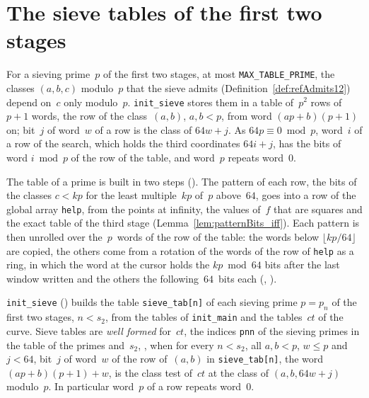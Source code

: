 \section{The sieve tables of the first two stages}\label{sec:sieveTables}

For a sieving prime~$p$ of the first two stages, at most \texttt{MAX\_TABLE\_PRIME}, the classes
$(a, b, c)$ modulo~$p$ that the sieve admits (Definition~\ref{def:refAdmits12}) depend on~$c$ only
modulo~$p$. \texttt{init\_sieve} stores them in a table of~$p^2$ rows of~$p + 1$ words, the row of
the class~$(a, b)$, $a, b < p$, from word $(a p + b)(p + 1)$ on; bit~$j$ of word~$w$ of a row is
the class of $64 w + j$. As $64 p \equiv 0 \bmod p$, word~$i$ of a row of the search, which holds
the third coordinates $64 i + j$, has the bits of word $i \bmod p$ of the row of the table, and
word~$p$ repeats word~$0$.

The table of a prime is built in two steps (). The pattern of each
row, the bits of the classes $c < k p$ for the least multiple~$k p$ of~$p$ above~$64$, goes into a
row of the global array \texttt{help}, from the points at infinity, the values of~$f$ that are
squares and the exact table of the third stage (Lemma~\ref{lem:patternBits_iff}). Each pattern is
then unrolled over the~$p$~words of the row of the table: the words below $\lfloor k p/64 \rfloor$
are copied, the others come from a rotation of the words of the row of \texttt{help} as a ring, in
which the word at the cursor holds the $k p \bmod 64$ bits after the last window written and the
others the following~$64$~bits each (,
).

\begin{definition}\label{def:SieveTables.WF}
  \leanok
  \texttt{init\_sieve} () builds the table \texttt{sieve\_tab[n]}
  of each sieving prime $p = p_n$ of the first two stages, $n < s_2$, from the tables of
  \texttt{init\_main} and the tables~$ct$ of the curve. Sieve tables are \emph{well formed}
  for~$ct$, the indices \texttt{pnn} of the sieving primes in the table of the primes and~$s_2$,
  , when for every $n < s_2$, all $a, b < p$, $w \le p$ and $j < 64$,
  bit~$j$ of word~$w$ of the row of~$(a, b)$ in \texttt{sieve\_tab[n]}, the word
  $(a p + b)(p + 1) + w$, is the class test  of~$ct$ at the
  class of $(a, b, 64 w + j)$ modulo~$p$. In particular word~$p$ of a row repeats word~$0$.
\end{definition}

